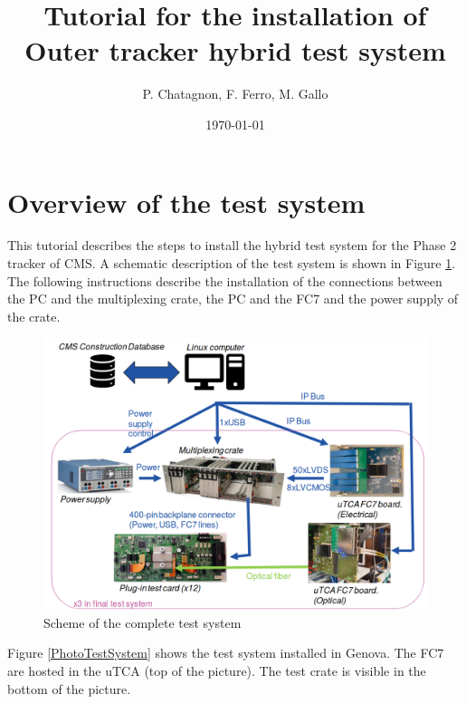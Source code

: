 \documentclass[10pt,a4paper]{article}
\begin{document}
\title{Tutorial for the installation of Outer tracker hybrid test system}
\author{P. Chatagnon, F. Ferro, M. Gallo}
\date{\today} 

\maketitle

\section{Overview of the test system}

This tutorial describes the steps to install the hybrid test system for the Phase 2 tracker of CMS. A schematic description of the test system is shown in Figure \ref{TestSchematic}. The following instructions describe the installation of the connections between the PC and the multiplexing crate, the PC and the FC7 and the power supply of the crate. 
\begin{figure}[h!]
 \includegraphics[width=\linewidth]{TestOverview.png} 
  \caption{Scheme of the complete test system}
  \label{TestSchematic}
\end{figure}

Figure \ref{PhotoTestSystem} shows the test system installed in Genova. The FC7 are hosted in the uTCA (top of the picture). The test crate is visible in the bottom of the picture.
\end{document}
